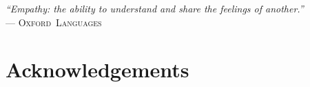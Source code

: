 ﻿\documentclass[../ppgc-tese.tex]{subfiles}
\begin{document}
\begin{flushright}
\mbox{}\vfill
{\sffamily\itshape
``Empathy: the ability to understand and share the feelings of another.''\\}
--- \textsc{Oxford~Languages}
\end{flushright}

\chapter*{Acknowledgements}

\end{document}
